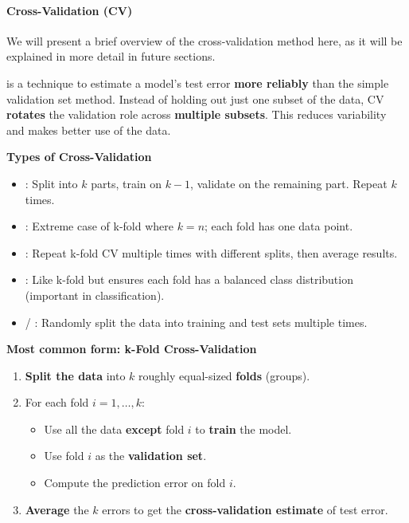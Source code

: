 \paragraph{Cross-Validation (CV)}\label{paragraph: Cross-Validation}

We will present a brief overview of the cross-validation method here, as it will be explained in more detail in future sections.

\highspace
{} is a technique to estimate a model's test error \textbf{more reliably} than the simple validation set method. Instead of holding out just one subset of the data, CV \textbf{rotates} the validation role across \textbf{multiple subsets}. This reduces variability and makes better use of the data.

\highspace
\begin{flushleft}
    \textcolor{Green3}{ \textbf{Types of Cross-Validation}}
\end{flushleft}
\begin{itemize}
    \item {}: Split into $k$ parts, train on $k - 1$, validate on the remaining part. Repeat $k$ times.
    \item {}: Extreme case of k-fold where $k = n$; each fold has one data point.
    \item {}: Repeat k-fold CV multiple times with different splits, then average results.
    \item {}: Like k-fold but ensures each fold has a balanced class distribution (important in classification).
    \item {} / : Randomly split the data into training and test sets multiple times.
\end{itemize}

\highspace
\begin{flushleft}
    \textcolor{Green3}{ \textbf{Most common form: k-Fold Cross-Validation}}
\end{flushleft}
\begin{enumerate}
    \item \textbf{Split the data} into $k$ roughly equal-sized \textbf{folds} (groups).
    \item For each fold $i = 1, \dots, k$:
    \begin{itemize}
        \item Use all the data \textbf{except} fold $i$ to \textbf{train} the model.
        \item Use fold $i$ as the \textbf{validation set}.
        \item Compute the prediction error on fold $i$.
    \end{itemize}
    \item \textbf{Average} the $k$ errors to get the \textbf{cross-validation estimate} of test error.
\end{enumerate}

